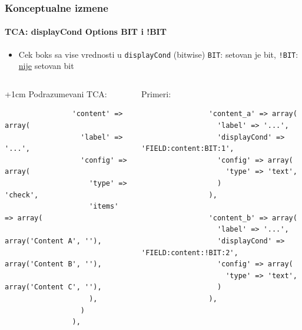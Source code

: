 
\begin{frame}[fragile]
	\frametitle{Konceptualne izmene}
	\framesubtitle{TCA: displayCond Options BIT i !BIT}

	\lstset{
		basicstyle=\tiny\ttfamily
	}

	\begin{itemize}
		\item Cek boks sa vise vrednosti u \texttt{displayCond} (bitwise)\newline
			\texttt{BIT}: setovan je bit, \texttt{!BIT}: \underline{nije} setovan bit 
	\end{itemize}

	\begin{columns}[T]

		\begin{column}{.5\textwidth}

			\advance\leftskip+1cm
			Podrazumevani TCA:

			\lstset{xleftmargin=1cm}

			\begin{lstlisting}
				'content' => array(
				  'label' => '...',
				  'config' => array(
				    'type' => 'check',
				    'items' => array(
				      array('Content A', ''),
				      array('Content B', ''),
				      array('Content C', ''),
				    ),
				  )
				),
			\end{lstlisting}

		\end{column}
		\begin{column}{.5\textwidth}

			Primeri:

			\begin{lstlisting}
				'content_a' => array(
				  'label' => '...',
				  'displayCond' => 'FIELD:content:BIT:1',
				  'config' => array(
				    'type' => 'text',
				  )
				),

				'content_b' => array(
				  'label' => '...',
				  'displayCond' => 'FIELD:content:!BIT:2',
				  'config' => array(
				    'type' => 'text',
				  )
				),
			\end{lstlisting}
		\end{column}

	\end{columns}

\end{frame}

